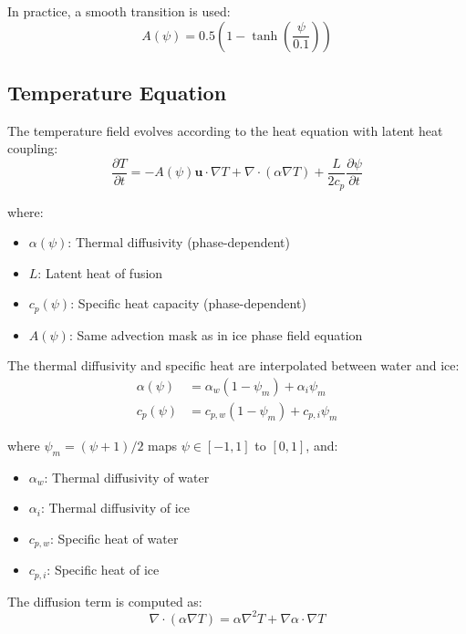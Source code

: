 \documentclass[12pt]{article}
\begin{document}
In practice, a smooth transition is used:
\begin{equation}
A(\psi) = 0.5 \left( 1 - \tanh\left(\frac{\psi}{0.1}\right) \right)
\label{eq:advection_mask}
\end{equation}

\subsection{Temperature Equation}

The temperature field evolves according to the heat equation with latent heat coupling:
\begin{equation}
\frac{\partial T}{\partial t} = -A(\psi) \mathbf{u} \cdot \nabla T + \nabla \cdot (\alpha \nabla T) + \frac{L}{2c_p} \frac{\partial \psi}{\partial t}
\label{eq:temperature}
\end{equation}

where:
\begin{itemize}
    \item $\alpha(\psi)$: Thermal diffusivity (phase-dependent)
    \item $L$: Latent heat of fusion
    \item $c_p(\psi)$: Specific heat capacity (phase-dependent)
    \item $A(\psi)$: Same advection mask as in ice phase field equation
\end{itemize}

The thermal diffusivity and specific heat are interpolated between water and ice:
\begin{align}
\alpha(\psi) &= \alpha_w (1 - \psi_m) + \alpha_i \psi_m \\
c_p(\psi) &= c_{p,w} (1 - \psi_m) + c_{p,i} \psi_m
\end{align}

where $\psi_m = (\psi + 1)/2$ maps $\psi \in [-1, 1]$ to $[0, 1]$, and:
\begin{itemize}
    \item $\alpha_w$: Thermal diffusivity of water
    \item $\alpha_i$: Thermal diffusivity of ice
    \item $c_{p,w}$: Specific heat of water
    \item $c_{p,i}$: Specific heat of ice
\end{itemize}

The diffusion term is computed as:
\begin{equation}
\nabla \cdot (\alpha \nabla T) = \alpha \nabla^2 T + \nabla \alpha \cdot \nabla T
\label{eq:diffusion_full}
\end{equation}
\end{document}
